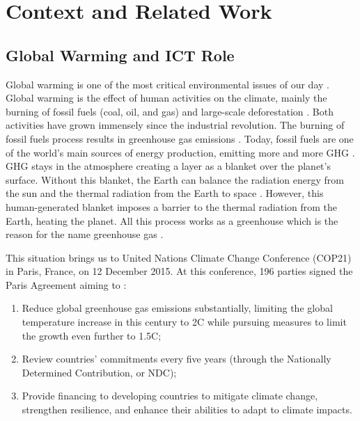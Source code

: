\chapter{Context and Related Work}
\label{cha:related_work}
\minitoc

\section{Global Warming and ICT Role}
Global warming is one of the most critical environmental issues of our day \cite{houghton2005global}. Global warming is the effect of human activities on the climate, mainly the burning of fossil fuels (coal, oil, and gas) and large-scale deforestation \cite{houghton2005global}. Both activities have grown immensely since the industrial revolution. The burning of fossil fuels process results in greenhouse gas emissions \cite{olabi2022renewable}. Today, fossil fuels are one of the world's main sources of energy production, emitting more and more GHG \cite{olabi2022renewable}. GHG stays in the atmosphere creating a layer as a blanket over the planet's surface. Without this blanket, the Earth can balance the radiation energy from the sun and the thermal radiation from the Earth to space \cite{houghton2005global}. However, this human-generated blanket imposes a barrier to the thermal radiation from the Earth, heating the planet. All this process works as a greenhouse which is the reason for the name greenhouse gas \cite{houghton2005global}.

This situation brings us to United Nations Climate Change Conference (COP21) in Paris, France, on 12 December 2015. At this conference, 196 parties signed the Paris Agreement aiming to \cite{nations_paris_nodate}:
\begin{enumerate}
    \item Reduce global greenhouse gas emissions substantially, limiting the global temperature increase in this century to 2\degree C while pursuing measures to limit the growth even further to 1.5\degree C;
    \item Review countries’ commitments every five years (through the Nationally Determined Contribution, or NDC);
    \item Provide financing to developing countries to mitigate climate change, strengthen resilience, and enhance their abilities to adapt to climate impacts. 
\end{enumerate}

